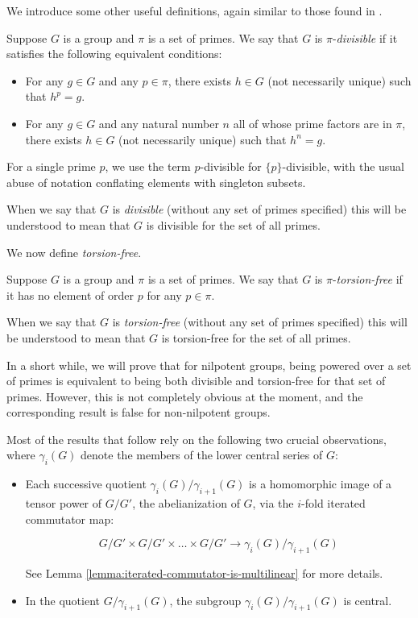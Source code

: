 We introduce some other useful definitions, again similar to those
found in \cite{Khukhro}.

\begin{definer}
  Suppose $G$ is a group and $\pi$ is a set of primes. We say that $G$
  is $\pi$-{\em divisible} if it satisfies the following equivalent conditions:

  \begin{itemize}
  \item For any $g \in G$ and any $p \in \pi$, there exists $h \in G$
    (not necessarily unique) such that $h^p = g$.
  \item For any $g \in G$ and any natural number $n$ all of whose
    prime factors are in $\pi$, there exists $h \in G$ (not
    necessarily unique) such that $h^n = g$.
  \end{itemize}
\end{definer}

For a single prime $p$, we use the term $p$-divisible for $\{ p
\}$-divisible, with the usual abuse of notation conflating elements with
singleton subsets.

When we say that $G$ is {\em divisible} (without any set of primes
specified) this will be understood to mean that $G$ is divisible for
the set of all primes.  

We now define {\em torsion-free}.

\begin{definer}
  Suppose $G$ is a group and $\pi$ is a set of primes. We say that $G$
  is $\pi$-{\em torsion-free} if it has no element of order $p$ for
  any $p \in \pi$.
\end{definer}

When we say that $G$ is {\em torsion-free} (without any set of primes
specified) this will be understood to mean that $G$ is torsion-free
for the set of all primes.

In a short while, we will prove that for nilpotent groups, being
powered over a set of primes is equivalent to being both divisible and
torsion-free for that set of primes. However, this is not completely
obvious at the moment, and the corresponding result is false for
non-nilpotent groups.

Most of the results that follow rely on the following two crucial
observations, where $\gamma_i(G)$ denote the members of the lower
central series of $G$:

\begin{itemize}
\item Each successive quotient $\gamma_i(G)/\gamma_{i+1}(G)$
  is a homomorphic image of a tensor power of $G/G'$, the
  abelianization of $G$, via the $i$-fold iterated commutator map:

  $$G/G' \times G/G' \times \dots \times G/G' \to \gamma_i(G)/\gamma_{i+1}(G)$$

  See Lemma \ref{lemma:iterated-commutator-is-multilinear} for more
  details.
\item In the quotient $G/\gamma_{i+1}(G)$, the subgroup
  $\gamma_i(G)/\gamma_{i+1}(G)$ is central.
\end{itemize}

